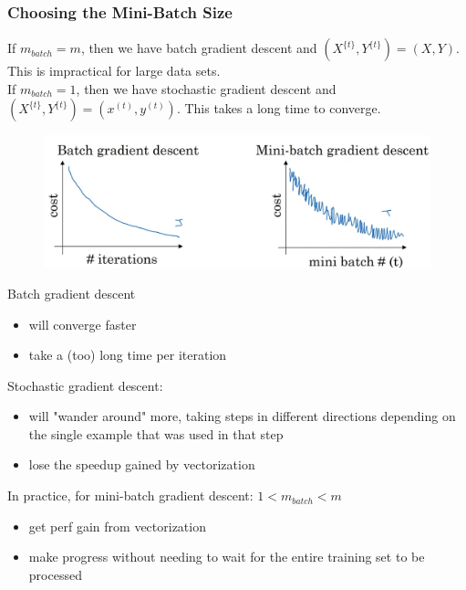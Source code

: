\subsubsection*{Choosing the Mini-Batch Size}

If $m_{batch}=m$, then we have batch gradient descent and $(X^{\{t\}}, Y^{\{t\}} )=(X, Y)$. This is impractical for large data sets. \\
If $m_{batch}=1$, then we have stochastic gradient descent and $(X^{\{t\}}, Y^{\{t\}} )=(x^{(t)},y^{(t)} )$. This takes a long time to converge.

\begin{figure}[htbp]
    \begin{minipage}[t]{\textwidth}
        \includegraphics[width=\linewidth]{images/batch_vs_minibatch_gd.png}
        \end{minipage}
\end{figure}

Batch gradient descent
\begin{itemize}
    \item will converge faster
	\item take a (too) long time per iteration
\end{itemize}
	
Stochastic gradient descent:
\begin{itemize}
    \item will "wander around" more, taking steps in different directions depending on the single example that was used in that step
	\item lose the speedup gained by vectorization
\end{itemize}
	

In practice, for mini-batch gradient descent: $1<m_{batch}<m$
\begin{itemize}
    \item get perf gain from vectorization
	\item make progress without needing to wait for the entire training set to be processed
\end{itemize}

